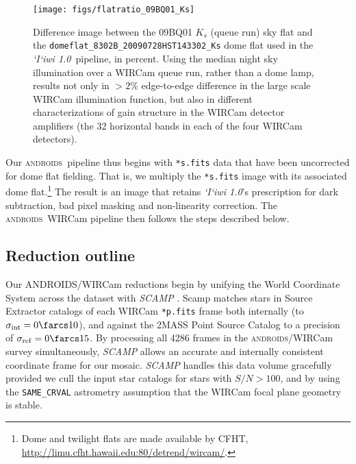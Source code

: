 \documentclass[iop]{emulateapj}
\newcommand{\sw}[1]{\textit{#1}} %
\newcommand{\iiwione}{\sw{`I`iwi 1.0}}
\newcommand{\androids}{\textsc{androids}}
\begin{document}
\begin{figure}[t]
\centering
\texttt{[image: figs/flatratio\_09BQ01\_Ks]}
\caption{Difference image between the 09BQ01 $K_s$ (queue run) sky flat and the \texttt{domeflat\_8302B\_20090728HST143302\_Ks} dome flat used in the \iiwione\ pipeline, in percent.
Using the median night sky illumination over a WIRCam queue run, rather than a dome lamp, results not only in $>2$\% edge-to-edge difference in the large scale WIRCam illumination function, but also in different characterizations of gain structure in the WIRCam detector amplifiers (the 32 horizontal bands in each of the four WIRCam detectors).}
\label{fig:domeflatratio}
\end{figure}

\vspace{1em}

Our \androids\ pipeline thus begins with \texttt{*s.fits} data that have been uncorrected for dome flat fielding.
That is, we multiply the \texttt{*s.fits} image with its associated dome flat.\footnote{Dome and twilight flats are made available by CFHT, \url{http://limu.cfht.hawaii.edu:80/detrend/wircam/}.}
The result is an image that retains \iiwione's prescription for dark subtraction, bad pixel masking and non-linearity correction.
The \androids\ WIRCam pipeline then follows the steps described below.

\subsection{Reduction outline}
\label{sec:reduction_outline}

Our ANDROIDS/WIRCam reductions begin by unifying the World Coordinate System across the dataset with \sw{SCAMP} \citep{Bertin:2006}.
Scamp matches stars in Source Extractor \citep{Bertin:1996} catalogs of each WIRCam \texttt{*p.fits} frame both internally (to $\sigma_\mathrm{int}=0\farcs 10$), and against the 2MASS Point Source Catalog \citep{Skrutskie:2006} to a precision of $\sigma_\mathrm{ref}=0 \farcs 15$.
By processing all 4286 frames in the \androids /WIRCam survey simultaneously, \sw{SCAMP} allows an accurate and internally consistent coordinate frame for our mosaic.
\sw{SCAMP} handles this data volume gracefully provided we cull the input star catalogs for stars with $S/N > 100$, and by using the \texttt{SAME\_CRVAL} astrometry assumption that the WIRCam focal plane geometry is stable.
\end{document}
